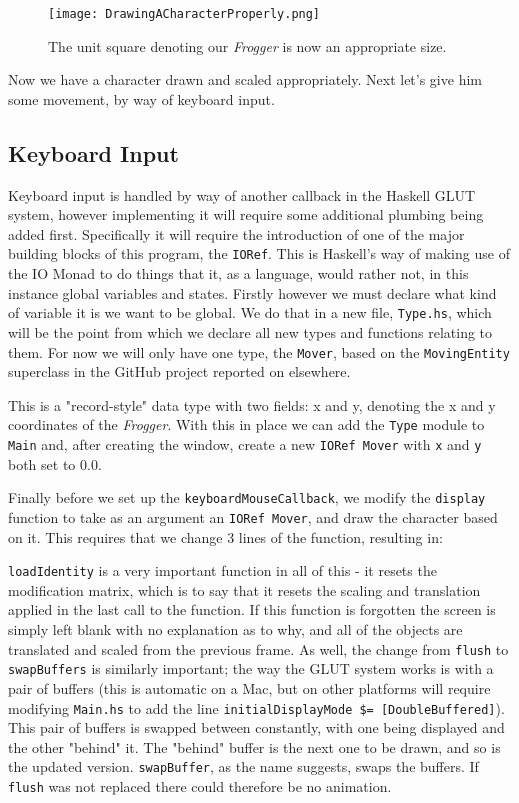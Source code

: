 \documentclass[12pt, a4paper]{report}
\begin{document}
\begin{figure}[ht]
  \centering
  \caption{The unit square denoting our \textit{Frogger} is now an appropriate size.}
  \texttt{[image: DrawingACharacterProperly.png]}
  \label{fig:drawingacharacterproperly}
\end{figure}

Now we have a character drawn and scaled appropriately.
Next let's give him some movement, by way of keyboard input.

\subsection{Keyboard Input}

Keyboard input is handled by way of another callback in the Haskell GLUT system, however implementing it will require some additional plumbing being added first.
Specifically it will require the introduction of one of the major building blocks of this program, the \verb|IORef|.
This is Haskell's way of making use of the IO Monad to do things that it, as a language, would rather not, in this instance global variables and states.
Firstly however we must declare what kind of variable it is we want to be global.
We do that in a new file, \verb|Type.hs|, which will be the point from which we declare all new types and functions relating to them.
For now we will only have one type, the \verb|Mover|, based on the \verb|MovingEntity| superclass in the GitHub project reported on elsewhere.

This is a "record-style" data type with two fields: x and y, denoting the x and y coordinates of the \textit{Frogger}.
With this in place we can add the \verb|Type| module to \verb|Main| and, after creating the window, create a new \verb|IORef Mover| with \verb|x| and \verb|y| both set to 0.0.

Finally before we set up the \verb|keyboardMouseCallback|, we modify the \verb|display| function to take as an argument an \verb|IORef Mover|, and draw the character based on it.
This requires that we change 3 lines of the function, resulting in:

\verb|loadIdentity| is a very important function in all of this - it resets the modification matrix, which is to say that it resets the scaling and translation applied in the last call to the function.
If this function is forgotten the screen is simply left blank with no explanation as to why, and all of the objects are translated and scaled from the previous frame.
As well, the change from \verb|flush| to \verb|swapBuffers| is similarly important; the way the GLUT system works is with a pair of buffers (this is automatic on a Mac, but on other platforms will require modifying \verb|Main.hs| to add the line \verb|initialDisplayMode $= [DoubleBuffered]|).
This pair of buffers is swapped between constantly, with one being displayed and the other "behind" it.
The "behind" buffer is the next one to be drawn, and so is the updated version.
\verb|swapBuffer|, as the name suggests, swaps the buffers.
If \verb|flush| was not replaced there could therefore be no animation.
\end{document}
